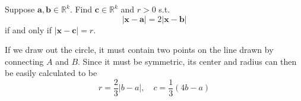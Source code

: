   \begin{exercise}[Rudin 1.19]
    Suppose $\mathbf{a}, \mathbf{b} \in \mathbb{R}^k$. Find $\mathbf{c} \in \mathbb{R}^k$ and $r > 0$ s.t. 
    \begin{equation}
      |\mathbf{x} - \mathbf{a}| = 2 | \mathbf{x} - \mathbf{b}|
    \end{equation}
    if and only if $|\mathbf{x} - \mathbf{c}| = r$. 
  \end{exercise}
  \begin{solution}
    If we draw out the circle, it must contain two points on the line drawn by connecting $A$ and $B$. Since it must be symmetric, its center and radius can then be easily calculated to be 
    \begin{equation}
      r = \frac{2}{3} |b - a|, \quad c = \frac{1}{3} (4b - a)
    \end{equation}
  \end{solution}

